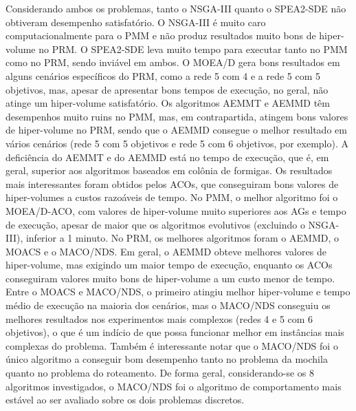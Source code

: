 Considerando ambos os problemas, tanto o NSGA-III quanto o SPEA2-SDE não obtiveram desempenho satisfatório. O NSGA-III é muito caro computacionalmente para o PMM e não produz resultados muito bons de hiper-volume no PRM. O SPEA2-SDE leva muito tempo para executar tanto no PMM como no PRM, sendo inviável em ambos. O MOEA/D gera bons resultados em alguns cenários específicos do PRM, como a rede 5 com 4 e a rede 5 com 5 objetivos, mas, apesar de apresentar bons tempos de execução, no geral, não atinge um hiper-volume satisfatório. Os algoritmos AEMMT e AEMMD têm desempenhos muito ruins no PMM, mas, em contrapartida, atingem bons valores de hiper-volume no PRM, sendo que o AEMMD consegue o melhor resultado em vários cenários (rede 5 com 5 objetivos e rede 5 com 6 objetivos, por exemplo). A deficiência do AEMMT e do AEMMD está no tempo de execução, que é, em geral, superior aos algoritmos baseados em colônia de formigas. Os resultados mais interessantes foram obtidos pelos ACOs, que conseguiram bons valores de hiper-volumes a custos razoáveis de tempo. No PMM, o melhor algoritmo foi o MOEA/D-ACO, com valores de hiper-volume muito superiores aos AGs e tempo de execução, apesar de maior que os algoritmos evolutivos (excluindo o NSGA-III), inferior a 1 minuto. No PRM, os melhores algoritmos foram o AEMMD, o MOACS e o MACO/NDS. Em geral, o AEMMD obteve melhores valores de hiper-volume, mas exigindo um maior tempo de execução, enquanto os ACOs conseguiram valores muito bons de hiper-volume a um custo menor de tempo. Entre o MOACS e MACO/NDS, o primeiro atingiu melhor hiper-volume e tempo médio de execução na maioria dos cenários, mas o MACO/NDS conseguiu os melhores resultados nos experimentos mais complexos (redes 4 e 5 com 6 objetivos), o que é um indício de que possa funcionar melhor em instâncias mais complexas do problema. Também é interessante notar que o MACO/NDS foi o único algoritmo a conseguir bom desempenho tanto no problema da mochila quanto no problema do roteamento. De forma geral, considerando-se os 8 algoritmos investigados, o MACO/NDS foi o algoritmo de comportamento mais estável ao ser avaliado sobre os dois problemas discretos.
